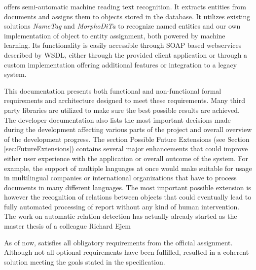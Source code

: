 
\textan{} offers semi-automatic machine reading 
text recognition. It extracts entities from documents and assigns them to objects
stored in the database. It utilizes existing solutions \emph{NameTag} and
\emph{MorphoDiTa} to recognize named entities and our own
implementation of object to entity assignment, both powered by machine learning.
Its functionality is easily accessible through SOAP based webservices described by
WSDL, either through the provided client application or through a custom
implementation offering additional features or integration to a legacy system.

This documentation presents both functional and non-functional formal requirements
and architecture designed to meet these requirements. Many third party libraries
are utilized to make sure the best possible results are achieved. The developer
documentation also lists the most important decisions made during the
development affecting various parts of the project and overall overview of the
development progress. The section Possible Future Extensions (see Section
\ref{sec:FutureExtensions}) contains several major enhancements that could improve
either user experience with the application or overall outcome of the system. For
example, the support of multiple languages at once would make \textan{} suitable
for usage in multilingual companies or international organizations that have to
process documents in many different languages. The most important possible
extension is however the recognition of relations between objects that could
eventually lead to fully automated processing of report without any kind of human
intervention. The work on automatic relation detection has actually already started as the master thesis of a colleague Richard Ejem~\cite{ejem14}

As of now, \textan{} satisfies all obligatory requirements from the official
assignment. Although not all optional requirements have been fulfilled, \textan{}
resulted in a coherent solution meeting the goals stated in the specification.
